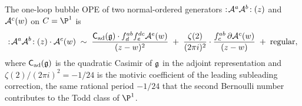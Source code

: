 \begin{theorem}
\label{thm:ch-ce-oneloop-motivic}
%
The one-loop bubble OPE of two normal-ordered generators
$:\!\mathcal{A}^a\mathcal{A}^b\!:(z)$ and $\mathcal{A}^c(w)$ on $C = \P^1$ is
\begin{equation}
\label{eq:oneloop-motivic-zeta2}
:\!\mathcal{A}^a\mathcal{A}^b\!:(z)\cdot\mathcal{A}^c(w)
\;\sim\;
\frac{\mathsf C_{\mathrm{ad}}(\mathfrak{g})\cdot f^{ab}_d f^{dc}_e\mathcal{A}^e(w)}
{(z-w)^2}
\;+\;
\frac{\zeta(2)}{(2\pi i)^2}\cdot
\frac{f^{ab}_c\,\partial\mathcal{A}^c(w)}{(z-w)}
\;+\;
\mathrm{regular},
\end{equation}
where $\mathsf C_{\mathrm{ad}}(\mathfrak{g})$ is the quadratic Casimir of $\mathfrak{g}$
in the adjoint representation and $\zeta(2)/(2\pi i)^2 = -1/24$ is the
motivic coefficient of the leading subleading correction, the same
rational period $-1/24$ that the second Bernoulli number contributes to
the Todd class of $\P^1$.
\end{theorem}


